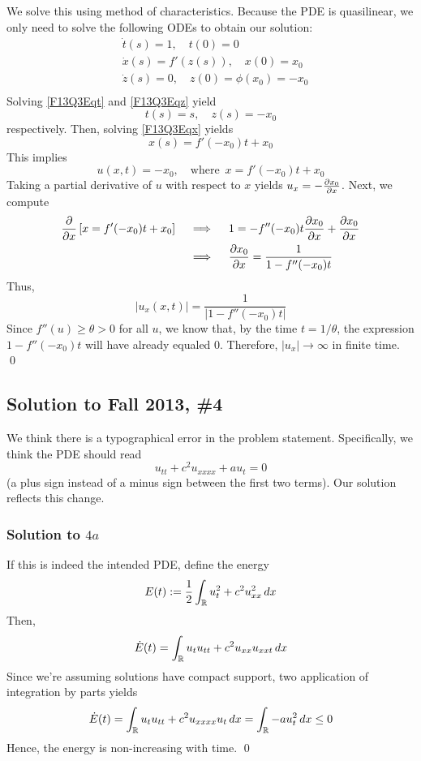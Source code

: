 We solve this using method of characteristics. Because the PDE is quasilinear, we only need to solve the following ODEs to obtain our solution:
\begin{align}
\label{F13Q3Eqt} &\dot t(s) = 1, \quad t(0) = 0 \\
\label{F13Q3Eqx} &\dot x(s) = f'(z(s)), \quad x(0) = x_0 \\
\label{F13Q3Eqz} &\dot z(s) = 0, \quad z(0) = \phi(x_0) = -x_0 \\
\end{align}
Solving \eqref{F13Q3Eqt} and \eqref{F13Q3Eqz} yield
$$ t(s) = s, \quad z(s) = -x_0 $$
respectively. Then, solving \eqref{F13Q3Eqx} yields
$$ x(s) = f'(-x_0)t + x_0 $$
This implies
$$ u(x,t) = -x_0, \quad \text{where} \,\,\, x = f'(-x_0)t + x_0 $$
Taking a partial derivative of $u$ with respect to $x$ yields $u_x = -\frac{\partial x_0}{\partial x}$. Next, we compute
\begin{align*}
\frac{\partial}{\partial x} \left[ x = f'(-x_0)t + x_0 \right] \quad &\implies \quad 1 = -f''(-x_0)t \frac{\partial x_0}{\partial x} + \frac{\partial x_0}{\partial x} \\
&\implies \quad \frac{\partial x_0}{\partial x} = \frac{1}{1 - f''(-x_0)t}
\end{align*}
Thus,
$$ |u_x(x,t)| = \frac{1}{|1-f''(-x_0)t|} $$
Since $f''(u) \geq \theta > 0$ for all $u$, we know that, by the time $t = 1/\theta$, the expression $1-f''(-x_0)t$ will have already equaled 0. Therefore, $|u_x| \to \infty$ in finite time. \hfill \qed



\subsection*{Solution to Fall 2013, \#4}
\label{F13Q4}

We think there is a typographical error in the problem statement. Specifically, we think the PDE should read
$$ u_{tt} + c^2 u_{xxxx} + au_t = 0 $$
(a plus sign instead of a minus sign between the first two terms). Our solution reflects this change.

\subsubsection*{Solution to $4a$}

If this is indeed the intended PDE, define the energy
$$ E(t) := \frac{1}{2} \int_{\mathbb{R}} u_t^2 + c^2 u_{xx}^2 \, dx $$
Then,
$$ \dot{E}(t) = \int_{\mathbb{R}} u_t u_{tt} + c^2 u_{xx} u_{xxt} \, dx $$
Since we're assuming solutions have compact support, two application of integration by parts yields
$$ \dot{E}(t) = \int_{\mathbb{R}} u_t u_{tt} + c^2 u_{xxxx}u_t \, dx = \int_{\mathbb{R}} -a u_t^2 \, dx \leq 0 $$
Hence, the energy is non-increasing with time. \hfill \qed

